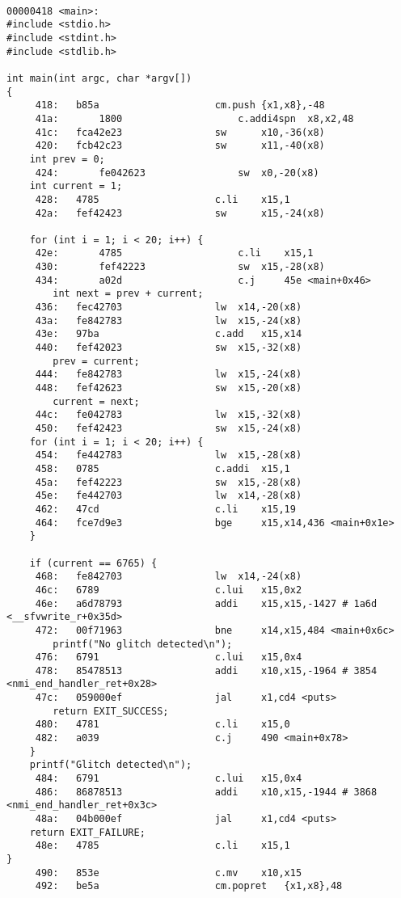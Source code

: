 \begin{lstlisting}[caption={Assembly code for coverage test program}, label=lst:asm_coverage, language=riscv]

00000418 <main>:
#include <stdio.h>
#include <stdint.h>
#include <stdlib.h>

int main(int argc, char *argv[])
{
     418:	b85a                    cm.push {x1,x8},-48
     41a:       1800                    c.addi4spn	x8,x2,48
     41c:	fca42e23                sw      x10,-36(x8)
     420:	fcb42c23                sw      x11,-40(x8)
    int prev = 0;
     424:       fe042623                sw	x0,-20(x8)
    int current = 1;
     428:	4785                    c.li    x15,1
     42a:	fef42423                sw      x15,-24(x8)

    for (int i = 1; i < 20; i++) {
     42e:       4785                    c.li    x15,1
     430:       fef42223                sw	x15,-28(x8)
     434:       a02d                    c.j     45e <main+0x46>
        int next = prev + current;
     436:	fec42703                lw	x14,-20(x8)
     43a:	fe842783                lw	x15,-24(x8)
     43e:	97ba                    c.add   x15,x14
     440:	fef42023                sw	x15,-32(x8)
        prev = current;
     444:	fe842783                lw	x15,-24(x8)
     448:	fef42623                sw	x15,-20(x8)
        current = next;
     44c:	fe042783                lw	x15,-32(x8)
     450:	fef42423                sw	x15,-24(x8)
    for (int i = 1; i < 20; i++) {
     454:	fe442783                lw	x15,-28(x8)
     458:	0785                    c.addi  x15,1
     45a:	fef42223                sw	x15,-28(x8)
     45e:	fe442703                lw	x14,-28(x8)
     462:	47cd                    c.li    x15,19
     464:	fce7d9e3                bge     x15,x14,436 <main+0x1e>
    }

    if (current == 6765) {
     468:	fe842703                lw	x14,-24(x8)
     46c:	6789                    c.lui   x15,0x2
     46e:	a6d78793                addi    x15,x15,-1427 # 1a6d <__sfvwrite_r+0x35d>
     472:	00f71963                bne     x14,x15,484 <main+0x6c>
        printf("No glitch detected\n");
     476:	6791                    c.lui   x15,0x4
     478:	85478513                addi    x10,x15,-1964 # 3854 <nmi_end_handler_ret+0x28>
     47c:	059000ef                jal     x1,cd4 <puts>
        return EXIT_SUCCESS;
     480:	4781                    c.li    x15,0
     482:	a039                    c.j     490 <main+0x78>
    }
    printf("Glitch detected\n");
     484:	6791                    c.lui   x15,0x4
     486:	86878513                addi    x10,x15,-1944 # 3868 <nmi_end_handler_ret+0x3c>
     48a:	04b000ef                jal     x1,cd4 <puts>
    return EXIT_FAILURE;
     48e:	4785                    c.li    x15,1
}
     490:	853e                    c.mv    x10,x15
     492:	be5a                    cm.popret	{x1,x8},48
\end{lstlisting}


